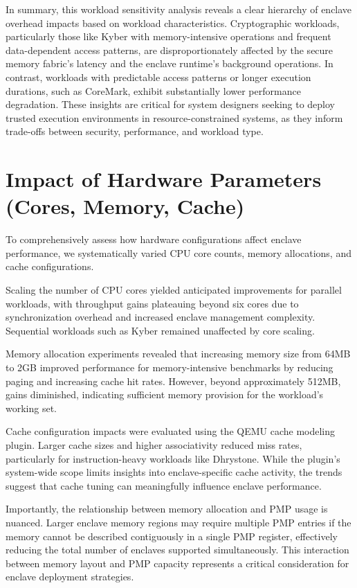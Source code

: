 
In summary, this workload sensitivity analysis reveals a clear hierarchy of enclave overhead impacts based on workload characteristics. Cryptographic workloads, particularly those like Kyber with memory-intensive operations and frequent data-dependent access patterns, are disproportionately affected by the secure memory fabric’s latency and the enclave runtime’s background operations. In contrast, workloads with predictable access patterns or longer execution durations, such as CoreMark, exhibit substantially lower performance degradation. These insights are critical for system designers seeking to deploy trusted execution environments in resource-constrained systems, as they inform trade-offs between security, performance, and workload type.

\section{Impact of Hardware Parameters (Cores, Memory, Cache)}

To comprehensively assess how hardware configurations affect enclave performance, we systematically varied CPU core counts, memory allocations, and cache configurations.

Scaling the number of CPU cores yielded anticipated improvements for parallel workloads, with throughput gains plateauing beyond six cores due to synchronization overhead and increased enclave management complexity. Sequential workloads such as Kyber remained unaffected by core scaling.

Memory allocation experiments revealed that increasing memory size from 64MB to 2GB improved performance for memory-intensive benchmarks by reducing paging and increasing cache hit rates. However, beyond approximately 512MB, gains diminished, indicating sufficient memory provision for the workload’s working set.

Cache configuration impacts were evaluated using the QEMU cache modeling plugin. Larger cache sizes and higher associativity reduced miss rates, particularly for instruction-heavy workloads like Dhrystone. While the plugin’s system-wide scope limits insights into enclave-specific cache activity, the trends suggest that cache tuning can meaningfully influence enclave performance.

Importantly, the relationship between memory allocation and PMP usage is nuanced. Larger enclave memory regions may require multiple PMP entries if the memory cannot be described contiguously in a single PMP register, effectively reducing the total number of enclaves supported simultaneously. This interaction between memory layout and PMP capacity represents a critical consideration for enclave deployment strategies.
